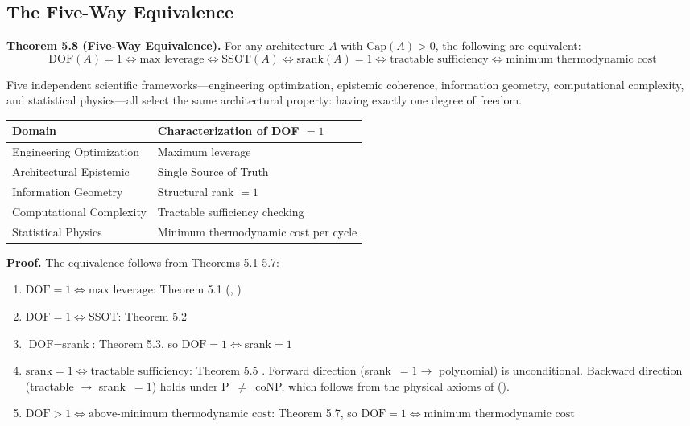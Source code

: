 \subsection{The Five-Way Equivalence}

\begin{formal}
\textbf{Theorem 5.8 (Five-Way Equivalence).} For any architecture $A$ with $\text{Cap}(A) > 0$, the following are equivalent:
\[
\text{DOF}(A) = 1 \iff \text{max leverage} \iff \text{SSOT}(A) \iff \text{srank}(A) = 1 \iff \text{tractable sufficiency} \iff \text{minimum thermodynamic cost}
\]
\end{formal}

\begin{informal}
Five independent scientific frameworks—engineering optimization, epistemic coherence, information geometry, computational complexity, and statistical physics—all select the same architectural property: having exactly one degree of freedom.
\end{informal}

\begin{center}
\begin{tabular}{ll}
\hline
\textbf{Domain} & \textbf{Characterization of DOF $= 1$} \\
\hline
Engineering Optimization & Maximum leverage \\
Architectural Epistemic & Single Source of Truth \\
Information Geometry & Structural rank $= 1$ \\
Computational Complexity & Tractable sufficiency checking \\
Statistical Physics & Minimum thermodynamic cost per cycle \\
\hline
\end{tabular}
\end{center}

\textbf{Proof.} The equivalence follows from Theorems 5.1-5.7:
\begin{enumerate}
\item $\text{DOF} = 1 \iff \text{max leverage}$: Theorem 5.1 (, )
\item $\text{DOF} = 1 \iff \text{SSOT}$: Theorem 5.2 \cite{paper2_ssot}
\item $\text{DOF} = \text{srank}$: Theorem 5.3, so $\text{DOF} = 1 \iff \text{srank} = 1$
\item $\text{srank} = 1 \iff \text{tractable sufficiency}$: Theorem 5.5 \cite{paper4_decision_quotient}. Forward direction (srank~$=1 \to$ polynomial) is unconditional. Backward direction (tractable $\to$ srank~$=1$) holds under P~$\neq$~coNP, which follows from the physical axioms of \cite{paper4_decision_quotient} ().
\item $\text{DOF} > 1 \iff \text{above-minimum thermodynamic cost}$: Theorem 5.7, so $\text{DOF} = 1 \iff \text{minimum thermodynamic cost}$
\end{enumerate}

